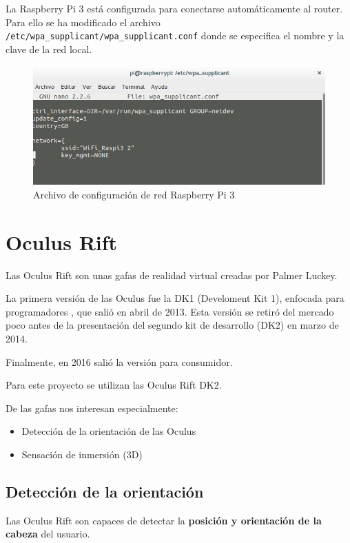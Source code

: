\documentclass[twoside, 11pt]{epstfg}
\begin{document}
La Raspberry Pi 3 está configurada para conectarse automáticamente al router. Para ello se ha modificado el archivo \texttt{/etc/wpa\_supplicant/wpa\_supplicant.conf} donde se especifica el nombre y la clave de la red local.

\begin{figure}[h]
	\centerline{
		\mbox{\includegraphics[width=.95\textwidth]{images/confRaspiWifi.png}}
	}
	\caption{Archivo de configuración de red Raspberry Pi 3}
\end{figure}
 

\section{Oculus Rift}

Las Oculus Rift son unas gafas de realidad virtual creadas por Palmer Luckey.

La primera versión de las Oculus fue la DK1 (Develoment Kit 1), enfocada para programadores , que salió en abril de 2013. Esta versión se retiró del mercado poco antes de la presentación del segundo kit de desarrollo (DK2) en marzo de 2014.

Finalmente, en 2016 salió la versión para consumidor.

Para este proyecto se utilizan las Oculus Rift DK2.


De las gafas nos interesan especialmente:
\begin{itemize}
	\item Detección de la orientación de las Oculus
	\item Sensación de inmersión (3D)
\end{itemize}

\subsection{Detección de la orientación}


Las Oculus Rift son capaces de detectar la \textbf{posición y orientación de la cabeza} del usuario.
\end{document}
